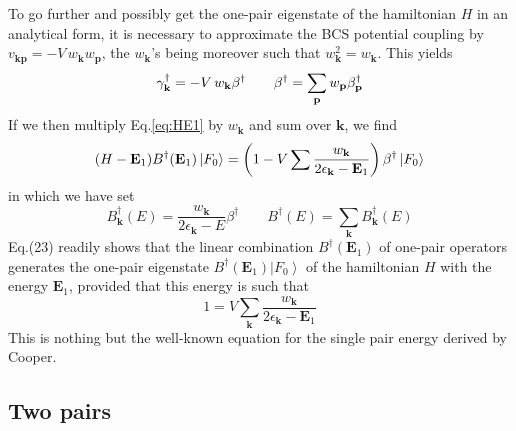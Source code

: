 \documentclass[aps,prb,superscriptaddress,twocolumn]{revtex4}
\newcommand{\vk}{\ensuremath{\mathbf{k}}}
\newcommand{\vp}{\ensuremath{\mathbf{p}}}
\begin{document}
To go further and possibly get the one-pair eigenstate of the hamiltonian $H$
in an analytical form, it is necessary to approximate the BCS potential
coupling by $v_{\mathbf{k} \mathbf{p} }=-V\,w_\vk{}w_\vp$, the $w_\vk$'s
being moreover such that $w_\vk^2=w_\vk$. This yields 
\begin{equation}  \label{eq:gammaBeta}
\gamma^{\dagger}_\vk=-V\,w_\vk\beta^{\dagger}\quad\quad\beta^{\dagger}=\sum_%
\vp{}w_\vp\beta^{\dagger}_\vp
\end{equation}
If we then multiply Eq.\eqref{eq:HE1} by $w_\vk$ and sum over $\mathbf{k} $,
we find 
\begin{equation}
(H-\mathbf{E} _1)B^{\dagger}(\mathbf{E} _1)\left|F_0\right>  =\left(1-V\sum{%
\frac{w_\vk}{2\epsilon_\vk-\mathbf{E} _1}}\right)
\beta^{\dagger}\left|F_0\right>  
\end{equation}
in which we have set 
\begin{equation}  \label{eq:B}
B_\vk^{\dagger}(E)=\frac{w_\vk}{2\epsilon_\vk-E}\beta^{\dagger}\quad\quad
B^{\dagger}(E)=\sum_\vk{B_\vk^{\dagger}(E)}
\end{equation}
Eq.(23) readily shows that the linear combination $B^{\dagger}(\mathbf{E} _1)
$ of one-pair operators generates the one-pair eigenstate $B^{\dagger}(%
\mathbf{E} _1)\left|F_0\right>  $ of the hamiltonian $H$ with the energy $%
\mathbf{E} _1$, provided that this energy is such that 
\begin{equation}  \label{eq:SchOne}
1=V\sum_\vk{\frac{w_\vk}{2\epsilon_\vk-\mathbf{E} _1}}
\end{equation}
This is nothing but the well-known equation for the single pair energy
derived by Cooper.

\subsection{Two pairs}
\end{document}
